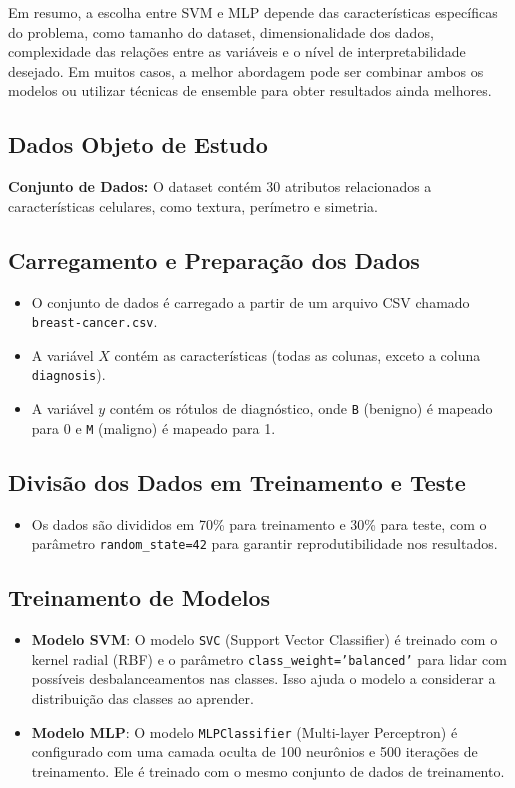 \documentclass[12pt,a4paper,oneside,openany]{article}
\begin{document}
\noindent Em resumo, a escolha entre SVM e MLP depende das características específicas do problema, como tamanho do dataset, dimensionalidade dos dados, complexidade das relações entre as variáveis e o nível de interpretabilidade desejado. Em muitos casos, a melhor abordagem pode ser combinar ambos os modelos ou utilizar técnicas de ensemble para obter resultados ainda melhores.

\subsection{Dados Objeto de Estudo}
    \textbf{Conjunto de Dados:} O dataset contém 30 atributos relacionados a características celulares, como textura, perímetro e simetria.
\subsection{Carregamento e Preparação dos Dados}
\begin{itemize}
    \item O conjunto de dados é carregado a partir de um arquivo CSV chamado \texttt{breast-cancer.csv}.
    \item A variável \(X\) contém as características (todas as colunas, exceto a coluna \texttt{diagnosis}).
    \item A variável \(y\) contém os rótulos de diagnóstico, onde \texttt{B} (benigno) é mapeado para 0 e \texttt{M} (maligno) é mapeado para 1.
\end{itemize}

\subsection{Divisão dos Dados em Treinamento e Teste}
\begin{itemize}
    \item Os dados são divididos em 70\% para treinamento e 30\% para teste, com o parâmetro \texttt{random\_state=42} para garantir reprodutibilidade nos resultados.
\end{itemize}

\subsection{Treinamento de Modelos}
\begin{itemize}
    \item \textbf{Modelo SVM}: O modelo \texttt{SVC} (Support Vector Classifier) é treinado com o kernel radial (RBF) e o parâmetro \texttt{class\_weight='balanced'} para lidar com possíveis desbalanceamentos nas classes. Isso ajuda o modelo a considerar a distribuição das classes ao aprender.
    \item \textbf{Modelo MLP}: O modelo \texttt{MLPClassifier} (Multi-layer Perceptron) é configurado com uma camada oculta de 100 neurônios e 500 iterações de treinamento. Ele é treinado com o mesmo conjunto de dados de treinamento.
\end{itemize}
\end{document}
